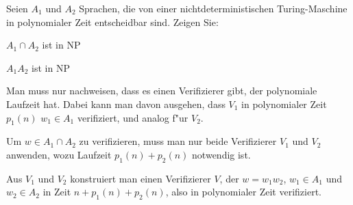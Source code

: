 Seien $A_1$ und $A_2$ Sprachen, die von einer nichtdeterministischen
Turing-Maschine in polynomialer Zeit entscheidbar sind. Zeigen Sie:
\begin{teilaufgaben}
\item $A_1\cap A_2$ ist in NP
\item $A_1A_2$ ist in NP
\end{teilaufgaben}

\begin{loesung}
Man muss nur nachweisen, dass es einen Verifizierer gibt, der polynomiale
Laufzeit hat. Dabei kann man davon ausgehen, dass $V_1$ in polynomialer
Zeit $p_1(n)$ $w_1\in A_1$ verifiziert, und analog f"ur $V_2$.
\begin{teilaufgaben}
\item
Um $w\in A_1\cap A_2$ zu verifizieren, muss man nur beide Verifizierer
$V_1$ und $V_2$ anwenden, wozu Laufzeit $p_1(n)+p_2(n)$ notwendig ist.
\item
Aus $V_1$ und $V_2$
konstruiert man einen Verifizierer $V$,
der $w=w_1w_2$, $w_1\in A_1$ und $w_2\in A_2$ in Zeit
$n + p_1(n) + p_2(n)$, also in polynomialer Zeit verifiziert.
\end{teilaufgaben}
\end{loesung}
